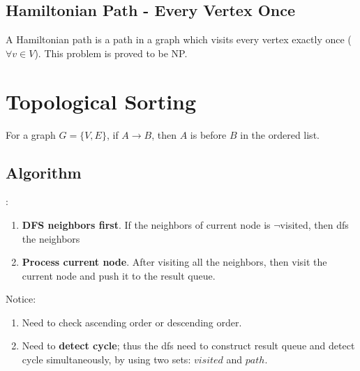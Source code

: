 \subsection{Hamiltonian Path - Every Vertex Once} 

A Hamiltonian path is a path in a graph which visits every vertex exactly once ($\forall v \in V$). This problem is proved to be NP.

\section{Topological Sorting}
For a graph $G=\{V, E\}$, if $A \rightarrow B $, then $A$ is before $B$ in the ordered list.
\subsection{Algorithm}
:
\begin{enumerate}
\item \textbf{DFS neighbors first}. If the neighbors of current node is  $\neg$visited, then dfs the neighbors
\item \textbf{Process current node}. After visiting all the neighbors, then visit the current node and push it to the result queue.

\end{enumerate}
Notice:
\begin{enumerate}
\item Need to check ascending order or descending order.
\item Need to \textbf{detect cycle}; thus the dfs need to construct result queue and detect cycle simultaneously, by using two sets: $visited$ and $path$.
\end{enumerate}

